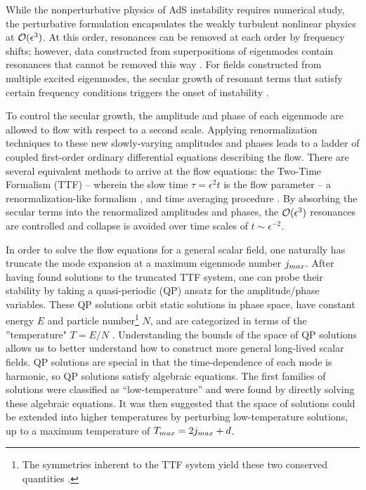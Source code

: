 \documentclass[../PhD.tex]{subfiles}
\begin{document}
While the nonperturbative physics of AdS instability requires numerical study, the perturbative formulation encapsulates the weakly turbulent nonlinear physics at $\mathcal O(\epsilon^3)$. At this order, resonances can be removed at each order by frequency shifts; however, data constructed from superpositions of eigenmodes contain resonances that cannot be removed this way \cite{1109.1825}. For fields constructed from multiple excited eigenmodes, the secular growth of resonant terms that satisfy certain frequency conditions triggers the onset of instability \cite{1109.1825, 1306.0317, 1312.5544, 1506.03519}.

To control the secular growth, the amplitude and phase of each eigenmode are allowed to flow with respect to a second scale. Applying renormalization techniques to these new slowly-varying amplitudes and phases leads to a ladder of coupled first-order ordinary differential equations describing the flow.  There are several equivalent methods to arrive at the flow equations: the Two-Time Formalism (TTF) -- wherein the slow time $\tau = \epsilon^2 t$ is the flow parameter \cite{1403.6471} -- a renormalization-like formalism \cite{1407.6273,1412.3249}, and time averaging procedure \cite{1412.3249,1510.07836}. By absorbing the secular terms into the renormalized amplitudes and phases, the $\mathcal O(\epsilon^3)$ resonances are controlled and collapse is avoided over time scales of $t \sim \epsilon^{-2}$. 

In order to solve the flow equations for a general scalar field, one naturally has truncate the mode expansion at a maximum eigenmode number $j_{max}$. After having found solutions to the truncated TTF system, one can probe their stability by taking a quasi-periodic (QP) ansatz for the amplitude/phase variables. These QP solutions orbit static solutions in phase space, have constant energy $E$ and particle number\footnote{ The symmetries inherent to the TTF system yield these two conserved quantities \cite{1412.4761}.} $N$, and are categorized in terms of the ''temperature" $T= E/N$ \cite{1403.6471,1507.08261}. Understanding the bounds of the space of QP solutions allows us to better understand how to construct more general long-lived scalar fields. QP solutions are special in that the time-dependence of each mode is harmonic, so QP solutions satisfy algebraic equations. The first families of solutions were classified as ``low-temperature'' and were found by directly solving these algebraic equations\cite{1507.08261}. It was then suggested that the space of solutions could be extended into higher temperatures by perturbing low-temperature solutions, up to a maximum temperature of $T_{max} = 2j_{max} + d$. 
\end{document}
